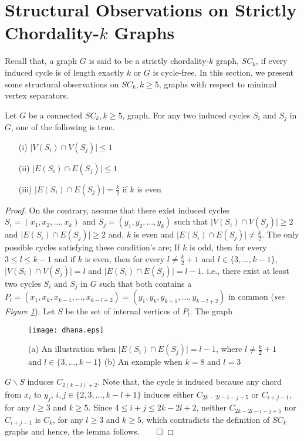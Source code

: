 \documentclass[runningheads]{llncs}
\begin{document}
 
\section{Structural Observations on Strictly Chordality-$k$ Graphs}
Recall that, a graph $G$ is said to be a strictly chordality-$k$ graph, $SC_k$, if every induced cycle is of length exactly $k$ or $G$ is cycle-free. In this section, we present some structural observations on $SC_k, k \geq 5$, graphs with respect to minimal vertex separators.

\begin{lemma}
\label{intersection}
Let $G$ be a connected $SC_k, k\geq 5$, graph. For any two induced cycles $S_i$ and $S_j$ in $G$, one of the following is true.
\begin{itemize}
\item[(i)] $\vert V(S_i) \cap V(S_j) \vert \leq 1$
\item[(ii)] $\vert E(S_i) \cap E(S_j) \vert \leq 1$
\item[(iii)] $\mid E(S_i) \cap E(S_j) \mid = \frac{k}{2}$ if $k$ is even
\end{itemize}
\end{lemma}
\begin{proof}
On the contrary, assume that there exist induced cycles $S_i = (x_1, x_2, \ldots, x_k)$ and $S_j = (y_1,y_2, \ldots, y_k)$ such that $\vert V(S_i) \cap V(S_j) \vert \geq 2$ and $\vert E(S_i) \cap E(S_j) \vert \geq 2$ and, $k$ is even and $\mid E(S_i) \cap E(S_j) \mid \neq \frac{k}{2}$. The only possible cycles satisfying these condition's are; If $k$ is odd, then for every $3 \leq l \leq k-1$ and if $k$ is even, then for every $l \neq \frac{k}{2}+1$ and $l \in \{3,\ldots, k-1\}$,  $\vert V(S_i) \cap V(S_j) \vert = l$ and $\vert E(S_i) \cap E(S_j) \vert = l-1$.  i.e., there exist at least two cycles $S_i$ and $S_j$ in $G$ such that both contains a $P_l = (x_1, x_k, x_{k-1}, \ldots, x_{k-l+2}) = (y_1, y_k, y_{k-1}, \ldots, y_{k-l+2})$ in common (\emph{see Figure  \ref{sisj}}). Let $S$ be the set of internal vertices of $P_l$. The graph 
\begin{figure}[h]
\centering
\texttt{[image: dhana.eps]}
\caption{(a) An illustration when $\vert E(S_i) \cap E(S_j) \vert = l-1$, where $l \neq \frac{k}{2}+1$ and $l \in \{3,\ldots, k-1\}$ (b) An example when $k=8$ and $l=3$}
\label{sisj}
\end{figure}
\noindent $G \backslash S$ induces $C_{2(k-l)+2}$. Note that, the cycle is induced because any chord from $x_i$ to $y_j$, $i,j \in \{2,3,\ldots,k-l+1\}$ induces either $C_{2k-2l-i-j+5}$ or $C_{i+j-1}$, for any $l \geq 3$ and $k \geq 5$. Since $4 \leq i+j \leq 2k-2l+2$, neither $C_{2k-2l-i-j+5}$ nor $C_{i+j-1}$ is $C_k$,  for any $l \geq 3$ and $k \geq 5$, which contradicts the definition of $SC_k$ graphs and hence, the lemma follows.$\hfill \qed$
\end{proof}
                                                                                                                                                                               
\end{document}
